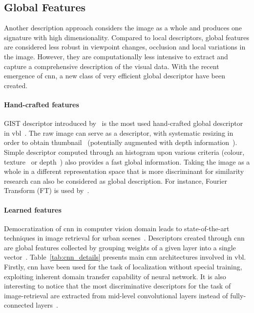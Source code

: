 	\subsection{Global Features}
	\label{subsec:global_feature}
		Another description approach considers the image as a whole and produces one signature with high dimensionality. Compared to local descriptors, global features are considered less robust in viewpoint changes, occlusion and local variations in the image. However, they are computationally less intensive to extract and capture a comprehensive description of the visual data. With the recent emergence of \ac{cnn}, a new class of very efficient global descriptor have been created.
		
		\paragraph{Hand-crafted features}
		 	GIST descriptor introduced by~\citet{Oliva2001} is the most used hand-crafted global descriptor in \ac{vbl}~\citep{Russell2011,Azzi2016,Hays2008}. The raw image can serve as a descriptor, with systematic resizing in order to obtain thumbnail~\citep{Hays2008,Corke2013} (potentially augmented with depth information~\citep{Gee2012}). Simple descriptor computed through an histogram upon various criteria (colour, texture~\citep{Hays2008} or depth~\citep{Ni2009}) also provides a fast global information. Taking the image as a whole in a different representation space that is more discriminant for similarity research can also be considered as global description. For instance, Fourier Transform (FT) is used by~\citet{Wan2016}.
			
		\paragraph{Learned features} 
			\label{para:global_cnn}
			Democratization of \ac{cnn} in computer vision domain leads to state-of-the-art techniques in image retrieval for urban scenes~\citep{Arandjelovic2017,Gordo2016,Kim2017a,Radenovic2016}. Descriptors created through \ac{cnn} are global features collected by grouping weights of a given layer into a single vector~\citep{Babenko2014}. Table~\ref{tab:cnn_details} presents main \ac{cnn} architectures involved in \ac{vbl}. Firstly, \ac{cnn} have been used for the task of localization without special training, exploiting inherent domain transfer capability of neural network. It is also interesting to notice that the most discriminative descriptors for the task of image-retrieval are extracted from mid-level convolutional layers instead of fully-connected layers~\citep{Babenko2014,Sunderhauf2015}.
			
